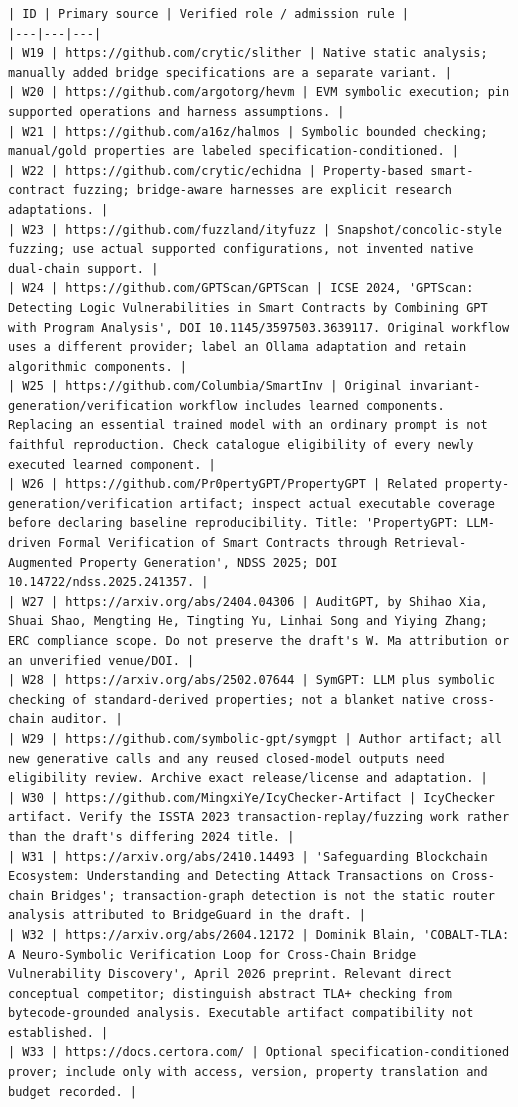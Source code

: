 \documentclass[11pt,a4paper]{article}
\begin{document}
\begin{verbatim}
| ID | Primary source | Verified role / admission rule |
|---|---|---|
| W19 | https://github.com/crytic/slither | Native static analysis; manually added bridge specifications are a separate variant. |
| W20 | https://github.com/argotorg/hevm | EVM symbolic execution; pin supported operations and harness assumptions. |
| W21 | https://github.com/a16z/halmos | Symbolic bounded checking; manual/gold properties are labeled specification-conditioned. |
| W22 | https://github.com/crytic/echidna | Property-based smart-contract fuzzing; bridge-aware harnesses are explicit research adaptations. |
| W23 | https://github.com/fuzzland/ityfuzz | Snapshot/concolic-style fuzzing; use actual supported configurations, not invented native dual-chain support. |
| W24 | https://github.com/GPTScan/GPTScan | ICSE 2024, 'GPTScan: Detecting Logic Vulnerabilities in Smart Contracts by Combining GPT with Program Analysis', DOI 10.1145/3597503.3639117. Original workflow uses a different provider; label an Ollama adaptation and retain algorithmic components. |
| W25 | https://github.com/Columbia/SmartInv | Original invariant-generation/verification workflow includes learned components. Replacing an essential trained model with an ordinary prompt is not faithful reproduction. Check catalogue eligibility of every newly executed learned component. |
| W26 | https://github.com/Pr0pertyGPT/PropertyGPT | Related property-generation/verification artifact; inspect actual executable coverage before declaring baseline reproducibility. Title: 'PropertyGPT: LLM-driven Formal Verification of Smart Contracts through Retrieval-Augmented Property Generation', NDSS 2025; DOI 10.14722/ndss.2025.241357. |
| W27 | https://arxiv.org/abs/2404.04306 | AuditGPT, by Shihao Xia, Shuai Shao, Mengting He, Tingting Yu, Linhai Song and Yiying Zhang; ERC compliance scope. Do not preserve the draft's W. Ma attribution or an unverified venue/DOI. |
| W28 | https://arxiv.org/abs/2502.07644 | SymGPT: LLM plus symbolic checking of standard-derived properties; not a blanket native cross-chain auditor. |
| W29 | https://github.com/symbolic-gpt/symgpt | Author artifact; all new generative calls and any reused closed-model outputs need eligibility review. Archive exact release/license and adaptation. |
| W30 | https://github.com/MingxiYe/IcyChecker-Artifact | IcyChecker artifact. Verify the ISSTA 2023 transaction-replay/fuzzing work rather than the draft's differing 2024 title. |
| W31 | https://arxiv.org/abs/2410.14493 | 'Safeguarding Blockchain Ecosystem: Understanding and Detecting Attack Transactions on Cross-chain Bridges'; transaction-graph detection is not the static router analysis attributed to BridgeGuard in the draft. |
| W32 | https://arxiv.org/abs/2604.12172 | Dominik Blain, 'COBALT-TLA: A Neuro-Symbolic Verification Loop for Cross-Chain Bridge Vulnerability Discovery', April 2026 preprint. Relevant direct conceptual competitor; distinguish abstract TLA+ checking from bytecode-grounded analysis. Executable artifact compatibility not established. |
| W33 | https://docs.certora.com/ | Optional specification-conditioned prover; include only with access, version, property translation and budget recorded. |


\end{verbatim}
\end{document}
